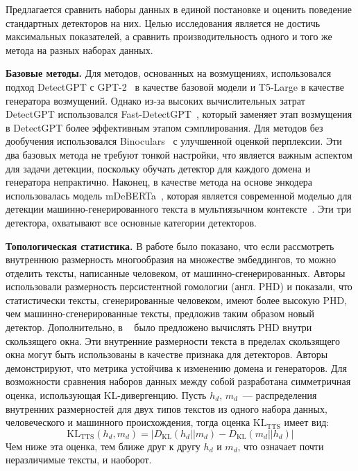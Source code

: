 Предлагается сравнить наборы данных в единой постановке и оценить поведение стандартных детекторов на них.
Целью исследования является не достичь максимальных показателей, а сравнить производительность одного и того же метода на разных наборах данных.

\textbf{Базовые методы.} Для методов, основанных на возмущениях, использовался подход DetectGPT с GPT-2~\cite{radford2019language} в качестве базовой модели и T5-Large \cite{t5} в качестве генератора возмущений.
Однако из-за высоких вычислительных затрат DetectGPT использовался Fast-DetectGPT~\cite{fast-detectgpt}, который заменяет этап возмущения в DetectGPT более эффективным этапом сэмплирования.
Для методов без дообучения использовался Binoculars~\cite{hans2024spotting} с улучшенной оценкой перплексии.
Эти два базовых метода не требуют тонкой настройки, что является важным аспектом для задачи детекции, поскольку обучать детектор для каждого домена и генератора непрактично.
Наконец, в качестве метода на основе энкодера использовалась модель
mDeBERTa~\cite{he2021deberta}, которая является современной моделью для детекции машинно-генерированного текста в мультиязычном контексте~\cite{macko-etal-2023-multitude}.
Эти три детектора, охватывают все основные категории детекторов.

\textbf{Топологическая статистика.} В работе \cite{Tulchinskii_phd} было показано, что если рассмотреть внутреннюю размерность многообразия на множестве эмбеддингов, то можно отделить тексты, написанные человеком, от машинно-сгенерированных.
Авторы использовали размерность персистентной гомологии (англ. PHD) и показали, что статистически тексты, сгенерированные человеком, имеют более высокую PHD, чем машинно-сгенерированные тексты, предложив таким образом новый детектор.
Дополнительно, в ~\cite{kushnareva2024boundary} было предложено вычислять PHD внутри скользящего окна.
Эти внутренние размерности текста в пределах скользящего окна могут быть использованы в качестве признака для детекторов.
Авторы демонстрируют, что метрика устойчива к изменению домена и генераторов.
Для возможности сравнения наборов данных между собой разработана симметричная оценка, использующая KL-дивергенцию.
Пусть $h_d$, $m_d$~--- распределения внутренних размерностей для двух типов текстов из одного набора данных, человеческого и машинного происхождения, тогда оценка $\text{KL}_{\text{TTS}}$ имеет вид:
\[
    \text{KL}_{\text{TTS}} (h_d, m_d) = | D_{\text{KL}}(h_d || m_d) - D_{\text{KL}}(m_d || h_d) |
\]
Чем ниже эта оценка, тем ближе друг к другу $h_d$ и $m_d$, что означает почти неразличимые тексты, и наоборот.

